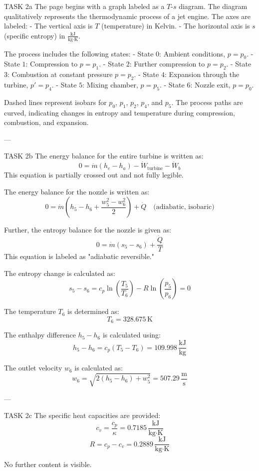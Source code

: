 TASK 2a  
The page begins with a graph labeled as a \( T \)-\( s \) diagram. The diagram qualitatively represents the thermodynamic process of a jet engine. The axes are labeled:  
- The vertical axis is \( T \) (temperature) in Kelvin.  
- The horizontal axis is \( s \) (specific entropy) in \( \frac{\text{kJ}}{\text{kg·K}} \).  

The process includes the following states:  
- State \( 0 \): Ambient conditions, \( p = p_0 \).  
- State \( 1 \): Compression to \( p = p_1 \).  
- State \( 2 \): Further compression to \( p = p_2 \).  
- State \( 3 \): Combustion at constant pressure \( p = p_2 \).  
- State \( 4 \): Expansion through the turbine, \( p' = p_4 \).  
- State \( 5 \): Mixing chamber, \( p = p_5 \).  
- State \( 6 \): Nozzle exit, \( p = p_0 \).  

Dashed lines represent isobars for \( p_0 \), \( p_1 \), \( p_2 \), \( p_4 \), and \( p_5 \). The process paths are curved, indicating changes in entropy and temperature during compression, combustion, and expansion.  

---

TASK 2b  
The energy balance for the entire turbine is written as:  
\[
0 = \dot{m} (h_e - h_a) - \dot{W}_{\text{turbine}} - \dot{W}_b
\]  
This equation is partially crossed out and not fully legible.  

The energy balance for the nozzle is written as:  
\[
0 = \dot{m} (h_5 - h_6 + \frac{w_5^2 - w_6^2}{2}) + \dot{Q} \quad \text{(adiabatic, isobaric)}
\]  

Further, the entropy balance for the nozzle is given as:  
\[
0 = \dot{m} (s_5 - s_6) + \frac{\dot{Q}}{T}
\]  
This equation is labeled as "adiabatic reversible."  

The entropy change is calculated as:  
\[
s_5 - s_6 = c_p \ln \left( \frac{T_5}{T_6} \right) - R \ln \left( \frac{p_5}{p_6} \right) = 0
\]  

The temperature \( T_6 \) is determined as:  
\[
T_6 = 328.675 \, \text{K}
\]  

The enthalpy difference \( h_5 - h_6 \) is calculated using:  
\[
h_5 - h_6 = c_p (T_5 - T_6) = 109.998 \, \frac{\text{kJ}}{\text{kg}}
\]  

The outlet velocity \( w_6 \) is calculated as:  
\[
w_6 = \sqrt{2 (h_5 - h_6) + w_5^2} = 507.29 \, \frac{\text{m}}{\text{s}}
\]  

---

TASK 2c  
The specific heat capacities are provided:  
\[
c_v = \frac{c_p}{\kappa} = 0.7185 \, \frac{\text{kJ}}{\text{kg·K}}
\]  
\[
R = c_p - c_v = 0.2889 \, \frac{\text{kJ}}{\text{kg·K}}
\]  

No further content is visible.